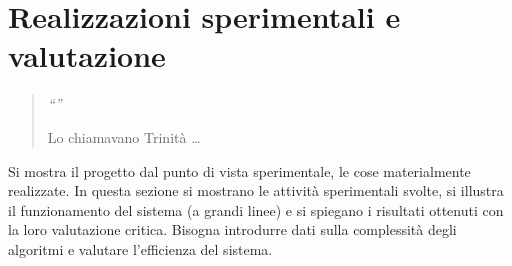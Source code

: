 \chapter{Realizzazioni sperimentali e valutazione}
\label{capitolo6}
\thispagestyle{empty}

\begin{quotation}
{\footnotesize
\noindent\emph{``''}
\begin{flushright}
Lo chiamavano Trinit\`a \dots
\end{flushright}
}
\end{quotation}
\vspace{0.5cm}

\noindent Si mostra il progetto dal punto di vista sperimentale, le cose materialmente realizzate. In questa sezione si mostrano le attivit\`a sperimentali svolte, si illustra il funzionamento del sistema (a grandi linee) e si spiegano i risultati ottenuti con la loro valutazione critica. Bisogna introdurre dati sulla complessit\`a degli algoritmi e valutare l'efficienza del sistema.